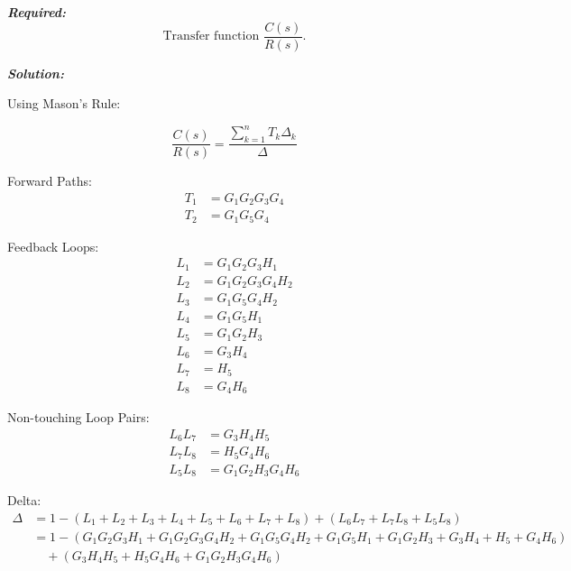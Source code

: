 \documentclass[11pt]{article}
\begin{document}
\noindent\textbf{\textit{Required:}}
\[
\text{Transfer function } \frac{C(s)}{R(s)}.
\]

\vspace{12pt}

\noindent \textbf{\textit{Solution:}}

\vspace{2pt}
{Using Mason's Rule:}

\[
\frac{C(s)}{R(s)} = \frac{\sum_{k=1}^{n} T_k \Delta_k}{\Delta}
\]

Forward Paths:
\begin{align*}
T_1 &= G_1 G_2 G_3 G_4 \\
T_2 &= G_1 G_5 G_4
\end{align*}

\vspace{0.5em}

Feedback Loops:
\begin{align*}
L_1 &= G_1 G_2 G_3 H_1 \\
L_2 &= G_1 G_2 G_3 G_4 H_2 \\
L_3 &= G_1 G_5 G_4 H_2 \\
L_4 &= G_1 G_5 H_1 \\
L_5 &= G_1 G_2 H_3 \\
L_6 &= G_3 H_4 \\
L_7 &= H_5 \\
L_8 &= G_4 H_6
\end{align*}

\vspace{0.5em}

Non-touching Loop Pairs:
\begin{align*}
L_6 L_7 &= G_3 H_4 H_5 \\
L_7 L_8 &= H_5 G_4 H_6 \\
L_5 L_8 &= G_1 G_2 H_3 G_4 H_6
\end{align*}

\vspace{0.5em}

Delta:
{\small
\begin{align*}
\Delta &= 1 - (L_1 + L_2 + L_3 + L_4 + L_5 + L_6 + L_7 + L_8) + (L_6 L_7 + L_7 L_8 + L_5 L_8) \\
       &= 1 - (G_1 G_2 G_3 H_1 + G_1 G_2 G_3 G_4 H_2 + G_1 G_5 G_4 H_2 + G_1 G_5 H_1 + G_1 G_2 H_3 + G_3 H_4 + H_5 + G_4 H_6) \\
       &\quad + (G_3 H_4 H_5 + H_5 G_4 H_6 + G_1 G_2 H_3 G_4 H_6)
\end{align*}
}

\vspace{0.5em}
\end{document}
